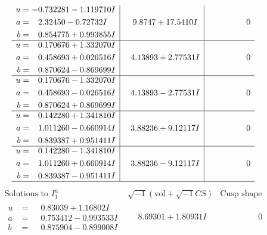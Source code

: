 \documentclass[1p]{elsarticle_modified}
\theoremstyle{definition}
\newcommand{\I}{\sqrt{-1}}
\begin{document}
$$\begin{array}{c|c|c}
\begin{aligned}
u &= -0.732281 - 1.119710 I \\
a &= \phantom{-}2.32450 - 0.72732 I \\
b &= \phantom{-}0.854775 + 0.993855 I\end{aligned}
 & \phantom{-}9.8747 + 17.5410 I & \phantom{-0.000000 } 0 \\ \hline\begin{aligned}
u &= \phantom{-}0.170676 + 1.332070 I \\
a &= \phantom{-}0.458693 + 0.026516 I \\
b &= \phantom{-}0.870624 - 0.869699 I\end{aligned}
 & \phantom{-}4.13893 + 2.77531 I & \phantom{-0.000000 } 0 \\ \hline\begin{aligned}
u &= \phantom{-}0.170676 - 1.332070 I \\
a &= \phantom{-}0.458693 - 0.026516 I \\
b &= \phantom{-}0.870624 + 0.869699 I\end{aligned}
 & \phantom{-}4.13893 - 2.77531 I & \phantom{-0.000000 } 0 \\ \hline\begin{aligned}
u &= \phantom{-}0.142280 + 1.341810 I \\
a &= \phantom{-}1.011260 - 0.660914 I \\
b &= \phantom{-}0.839387 + 0.951411 I\end{aligned}
 & \phantom{-}3.88236 + 9.12117 I & \phantom{-0.000000 } 0 \\ \hline\begin{aligned}
u &= \phantom{-}0.142280 - 1.341810 I \\
a &= \phantom{-}1.011260 + 0.660914 I \\
b &= \phantom{-}0.839387 - 0.951411 I\end{aligned}
 & \phantom{-}3.88236 - 9.12117 I & \phantom{-0.000000 } 0\\
 \hline 
 \end{array}$$\newpage$$\begin{array}{c|c|c}  
\text{Solutions to }I^u_{1}& \I (\text{vol} + \sqrt{-1}CS) & \text{Cusp shape}\\
 \hline 
\begin{aligned}
u &= \phantom{-}0.83039 + 1.16802 I \\
a &= \phantom{-}0.753412 - 0.993533 I \\
b &= \phantom{-}0.875904 - 0.899008 I\end{aligned}
 & \phantom{-}8.69301 + 1.80931 I & \phantom{-0.000000 } 0 \\ \hline\begin{aligned}

\end{aligned}
\end{array}$$
\end{document}
